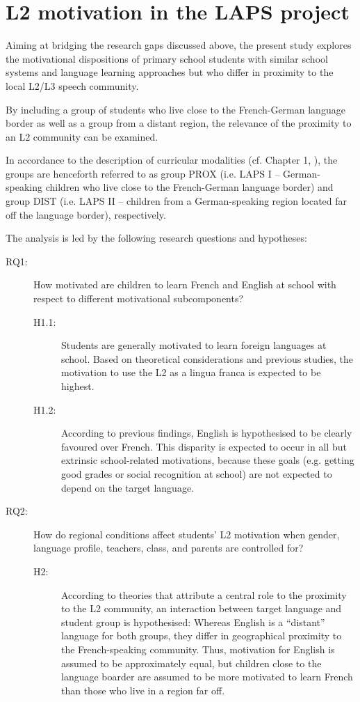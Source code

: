 \documentclass[output=paper]{langsci/langscibook}
\begin{document}
\section{L2 motivation in the LAPS project}

Aiming at bridging the research gaps discussed above, the present study explores the motivational dispositions of primary school students with similar school systems and language learning approaches but who differ in proximity to the local L2/L3 speech community. 

By including a group of students who live close to the French-German language border as well as a group from a distant region, the relevance of the proximity to an L2 community can be examined. 

In accordance to the description of curricular modalities (cf. Chapter 1, ), the groups are henceforth referred to as group PROX (i.e. LAPS I – German-speaking children who live close to the French-German language border) and group DIST (i.e. LAPS II – children from a German-speaking region located far off the language border), respectively.

The analysis is led by the following research questions and hypotheses:

\begin{description}
\item[RQ1:] How motivated are children to learn French and English at school with respect to different motivational subcomponents?
    \begin{description}
    \item[H1.1:] Students are generally motivated to learn foreign languages at school. Based on theoretical considerations and previous studies, the motivation to use the L2 as a lingua franca is expected to be highest.
    \item[H1.2:] According to previous findings, English is hypothesised to be clearly favoured over French. This disparity is expected to occur in all but extrinsic school-related motivations, because these goals (e.g. getting good grades or social recognition at school) are not expected to depend on the target language.
    \end{description}

\item[RQ2:] How do regional conditions affect students’ L2 motivation when gender, language profile, teachers, class, and parents are controlled for?
   \begin{description}
   \item[H2:] According to theories that attribute a central role to the proximity to the L2 community, an interaction between target language and student group is hypothesised: Whereas English is a ``distant'' language for both groups, they differ in geographical proximity to the French-speaking community. Thus, motivation for English is assumed to be approximately equal, but children close to the language boarder are assumed to be more motivated to learn French than those who live in a region far off.
   \end{description}
\end{description}
\end{document}
